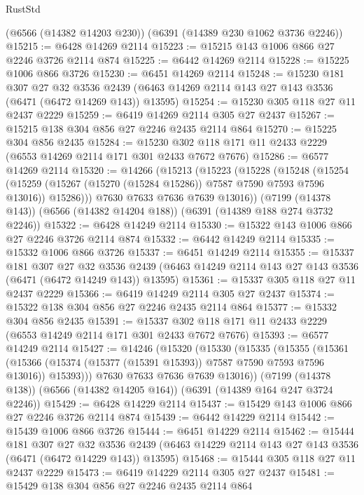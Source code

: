 \begin{lexlean}{RustStd}
\begin{coremodule}
{\begin{coremodule}
{{{{{{{{{{{{{{{{{{{{{{{{{{    (@6566 (@14382 @14203 @230))
    (@6391 (@14389 @230 @1062 @3736 @2246))
@15215 := @6428 @14269 @2114
@15223 := @15215 @143 @1006 @866 @27 @2246 @3726 @2114 @874
@15225 := @6442 @14269 @2114
@15228 := @15225 @1006 @866 @3726
@15230 := @6451 @14269 @2114
@15248 := @15230
    @181
    @307
    @27
    @32
    @3536
    @2439
    (@6463 @14269 @2114 @143 @27 @143 @3536 (@6471 (@6472 @14269 @143)) @13595)
@15254 := @15230 @305 @118 @27 @11 @2437 @2229
@15259 := @6419 @14269 @2114 @305 @27 @2437
@15267 := @15215 @138 @304 @856 @27 @2246 @2435 @2114 @864
@15270 := @15225 @304 @856 @2435
@15284 := @15230 @302 @118 @171 @11 @2433 @2229 (@6553 @14269 @2114 @171 @301 @2433 @7672 @7676)
@15286 := @6577 @14269 @2114
@15320 := @14266
    (@15213
      (@15223
        (@15228
          (@15248
            (@15254
              (@15259 (@15267 (@15270 (@15284 @15286)) @7587 @7590 @7593 @7596 @13016))
              @15286)))
        @7630
        @7633
        @7636
        @7639
        @13016))
    (@7199 (@14378 @143))
    (@6566 (@14382 @14204 @188))
    (@6391 (@14389 @188 @274 @3732 @2246))
@15322 := @6428 @14249 @2114
@15330 := @15322 @143 @1006 @866 @27 @2246 @3726 @2114 @874
@15332 := @6442 @14249 @2114
@15335 := @15332 @1006 @866 @3726
@15337 := @6451 @14249 @2114
@15355 := @15337
    @181
    @307
    @27
    @32
    @3536
    @2439
    (@6463 @14249 @2114 @143 @27 @143 @3536 (@6471 (@6472 @14249 @143)) @13595)
@15361 := @15337 @305 @118 @27 @11 @2437 @2229
@15366 := @6419 @14249 @2114 @305 @27 @2437
@15374 := @15322 @138 @304 @856 @27 @2246 @2435 @2114 @864
@15377 := @15332 @304 @856 @2435
@15391 := @15337 @302 @118 @171 @11 @2433 @2229 (@6553 @14249 @2114 @171 @301 @2433 @7672 @7676)
@15393 := @6577 @14249 @2114
@15427 := @14246
    (@15320
      (@15330
        (@15335
          (@15355
            (@15361
              (@15366 (@15374 (@15377 (@15391 @15393)) @7587 @7590 @7593 @7596 @13016))
              @15393)))
        @7630
        @7633
        @7636
        @7639
        @13016))
    (@7199 (@14378 @138))
    (@6566 (@14382 @14205 @164))
    (@6391 (@14389 @164 @247 @3724 @2246))
@15429 := @6428 @14229 @2114
@15437 := @15429 @143 @1006 @866 @27 @2246 @3726 @2114 @874
@15439 := @6442 @14229 @2114
@15442 := @15439 @1006 @866 @3726
@15444 := @6451 @14229 @2114
@15462 := @15444
    @181
    @307
    @27
    @32
    @3536
    @2439
    (@6463 @14229 @2114 @143 @27 @143 @3536 (@6471 (@6472 @14229 @143)) @13595)
@15468 := @15444 @305 @118 @27 @11 @2437 @2229
@15473 := @6419 @14229 @2114 @305 @27 @2437
@15481 := @15429 @138 @304 @856 @27 @2246 @2435 @2114 @864
}}}}}}}}}}}}}}}}}}}}}}}}}}
\end{coremodule}}
\end{coremodule}
\end{lexlean}
